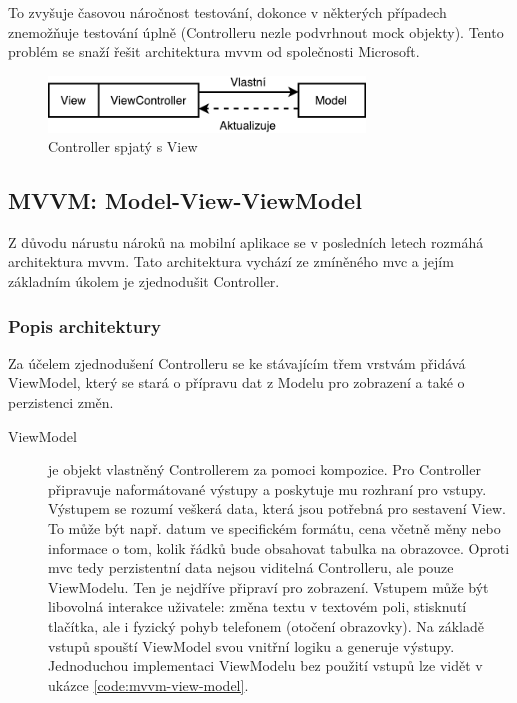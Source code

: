 To zvyšuje časovou náročnost testování, dokonce v některých případech znemožňuje testování úplně (Controlleru nezle podvrhnout mock objekty).
Tento problém se snaží řešit architektura \acrfull{mvvm} od společnosti Microsoft.

\begin{figure}\centering
	\includegraphics[width=0.75\textwidth]{assets/analysis-massive-view-controller.pdf}
	\caption[Role Controlleru v MVC]{Controller spjatý s View}\label{fig:massive-mvc}
\end{figure}

\subsection{MVVM: Model-View-ViewModel}\label{analyza-mvvm}

Z důvodu nárustu nároků na mobilní aplikace se v posledních letech rozmáhá architektura \acrshort{mvvm}.
Tato architektura vychází ze zmíněného \acrshort{mvc} a jejím základním úkolem je zjednodušit Controller.

\subsubsection*{Popis architektury} \label{architektura-mvvm-popis}

Za účelem zjednodušení Controlleru se ke stávajícím třem vrstvám přidává ViewModel, který se stará o přípravu dat z Modelu pro zobrazení a také o perzistenci změn.

\begin{description}
  \item[ViewModel] je objekt vlastněný Controllerem za pomoci kompozice.
  Pro Controller připravuje naformátované výstupy a poskytuje mu rozhraní pro vstupy.
  Výstupem se rozumí veškerá data, která jsou potřebná pro sestavení View.
  To může být např. datum ve specifickém formátu, cena včetně měny nebo informace o tom, kolik řádků bude obsahovat tabulka na obrazovce.
  Oproti \acrshort{mvc} tedy perzistentní data nejsou viditelná Controlleru, ale pouze ViewModelu.
  Ten je nejdříve připraví pro zobrazení.
  Vstupem může být libovolná interakce uživatele:
  změna textu v textovém poli, stisknutí tlačítka, ale i fyzický pohyb telefonem (otočení obrazovky).
  Na základě vstupů spouští ViewModel svou vnitřní logiku a generuje výstupy.
  Jednoduchou implementaci ViewModelu bez použití vstupů lze vidět v ukázce \ref{code:mvvm-view-model}.
\end{description}

